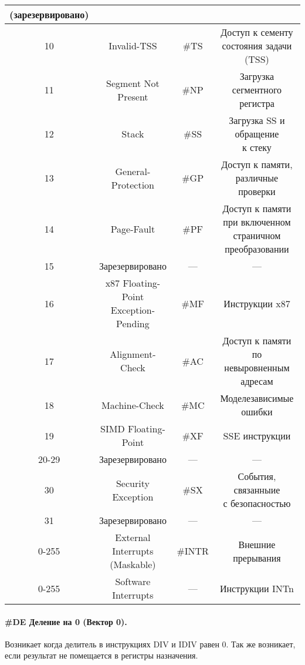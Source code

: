 \begin{center}
\begin{longtable}{|c|c|c|c|}
{    (зарезервировано)} \\
    \hline
    10  & Invalid-TSS & \#TS & \makecell{Доступ к сементу \\ состояния задачи (TSS)} \\
    \hline
    11  & Segment Not Present & \#NP & \makecell{Загрузка сегментного \\ регистра} \\
    \hline
    12  & Stack & \#SS & \makecell{Загрузка SS и обращение \\ к стеку} \\
    \hline
    13  & General-Protection & \#GP & \makecell{Доступ к памяти, \\ различные проверки} \\
    \hline
    14  & Page-Fault & \#PF & \makecell{Доступ к памяти \\ при включенном страничном \\
    преобразовании} \\
    \hline
    15  & Зарезервировано & --- & --- \\
    \hline
    16  & \makecell{x87 Floating-Point \\ Exception-Pending} & \#MF & Инструкции x87 \\
    \hline
    17  & Alignment-Check & \#AC & \makecell{Доступ к памяти \\ по невыровненным адресам} \\
    \hline
    18  & Machine-Check & \#MC & Моделезависимые ошибки \\
    \hline
    19  & SIMD Floating-Point & \#XF & SSE инструкции \\
    \hline
    20-29  & Зарезервировано & --- & --- \\
    \hline
    30  & Security Exception & \#SX & \makecell{События, связанныие \\ с безопасностью} \\
    \hline
    31  & Зарезервировано & --- & --- \\
    \hline
    0-255  & \makecell{External Interrupts \\ (Maskable)} & \#INTR & Внешние прерывания \\
    \hline
    0-255  & Software Interrupts & --- & Инструкции INTn \\
    \hline
  \end{longtable}
\end{center}

\paragraph{\#DE Деление на 0 (Вектор 0).}
Возникает когда делитель в инструкциях DIV и IDIV равен 0. Так же возникает,
если результат не помещается в регистры назначения.

